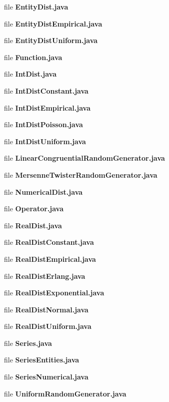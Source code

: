 \begin{DoxyCompactItemize}
\item 
file {\bfseries Entity\-Dist.\-java}
\item 
file {\bfseries Entity\-Dist\-Empirical.\-java}
\item 
file {\bfseries Entity\-Dist\-Uniform.\-java}
\item 
file {\bfseries Function.\-java}
\item 
file {\bfseries Int\-Dist.\-java}
\item 
file {\bfseries Int\-Dist\-Constant.\-java}
\item 
file {\bfseries Int\-Dist\-Empirical.\-java}
\item 
file {\bfseries Int\-Dist\-Poisson.\-java}
\item 
file {\bfseries Int\-Dist\-Uniform.\-java}
\item 
file {\bfseries Linear\-Congruential\-Random\-Generator.\-java}
\item 
file {\bfseries Mersenne\-Twister\-Random\-Generator.\-java}
\item 
file {\bfseries Numerical\-Dist.\-java}
\item 
file {\bfseries Operator.\-java}
\item 
file {\bfseries Real\-Dist.\-java}
\item 
file {\bfseries Real\-Dist\-Constant.\-java}
\item 
file {\bfseries Real\-Dist\-Empirical.\-java}
\item 
file {\bfseries Real\-Dist\-Erlang.\-java}
\item 
file {\bfseries Real\-Dist\-Exponential.\-java}
\item 
file {\bfseries Real\-Dist\-Normal.\-java}
\item 
file {\bfseries Real\-Dist\-Uniform.\-java}
\item 
file {\bfseries Series.\-java}
\item 
file {\bfseries Series\-Entities.\-java}
\item 
file {\bfseries Series\-Numerical.\-java}
\item 
file {\bfseries Uniform\-Random\-Generator.\-java}
\end{DoxyCompactItemize}
